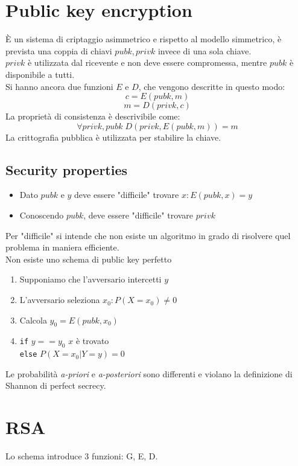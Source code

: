 \documentclass[a4paper,12pt]{article}
\begin{document}
\newpage

\section{Public key encryption}
È un sistema di criptaggio asimmetrico e rispetto al modello simmetrico, è prevista una coppia di chiavi $pubk,privk$ invece di una sola chiave. \\
$privk$ è utilizzata dal ricevente e non deve essere compromessa, mentre $pubk$ è disponibile a tutti. \\
Si hanno ancora due funzioni $E$ e $D$, che vengono descritte in questo modo:
$$c = E(pubk,m)$$
$$m = D(privk,c)$$
La proprietà di consistenza è descrivibile come:
$$\forall privk,pubk \; D(privk, E(pubk,m)) = m$$
La crittografia pubblica è utilizzata per stabilire la chiave.

\subsection{Security properties}
\begin{itemize}
	\item Dato $pubk$ e $y$ deve essere "difficile" trovare $x : E(pubk, x) = y$
	\item Conoscendo $pubk$, deve essere "difficile" trovare $privk$
\end{itemize}
Per "difficile" si intende che non esiste un algoritmo in grado di risolvere quel problema in maniera efficiente. \\
Non esiste uno schema di public key perfetto
\begin{enumerate}
	\item Supponiamo che l'avversario intercetti $y$
	\item L'avversario seleziona $x_0 : P(X = x_0) \neq 0$
	\item Calcola $y_0 = E(pubk, x_0)$
	\item \texttt{if} $y == y_0$ $x$ è trovato \\ \texttt{else} $P(X=x_0|Y=y) = 0$
\end{enumerate}
Le probabilità \textit{a-priori} e \textit{a-posteriori} sono differenti e violano la definizione di Shannon di perfect secrecy.

\section{RSA}
Lo schema introduce 3 funzioni: G, E, D.
\end{document}
